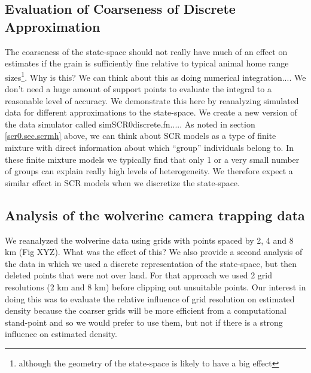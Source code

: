 \subsection{Evaluation of Coarseness of Discrete Approximation}
The coarseness of the state-space should not really have much of an effect on estimates if the grain is sufficiently fine relative to typical animal home range sizes\footnote{ although the geometry of the state-space is likely to have a big effect}. Why is this? We can think about this as doing numerical integration.... We don't need a huge amount of support points to evaluate the integral to a reasonable level of accuracy. We demonstrate this here by reanalyzing simulated data for different approximations to the state-space. We create a new version of the data simulator called simSCR0discrete.fn.....
As noted in section \ref{scr0.sec.scrmh} above, we can think about SCR
models as a type of finite mixture \citep{norris_pollock:1996,
  pledger:2000} with direct information about which ``group'' individuals belong to. In these finite mixture models we typically find that only 1 or a very small number of groups can explain really high levels of heterogeneity. We therefore expect a similar effect in SCR models when we discretize the state-space. 


\subsection{Analysis of the wolverine camera trapping data}

We reanalyzed the wolverine data using grids with points spaced by 2, 4 and 8 km (Fig XYZ). What was the effect of this?
We also provide a second analysis of the data in which we used a discrete representation of the state-space, but then deleted points that were not over land. For that approach we used 2 grid resolutions (2 km and 8 km) before clipping out unsuitable points. Our interest in doing this was to evaluate the relative influence of grid resolution on estimated density because the coarser grids will be more efficient from a computational stand-point and so we would prefer to use them, but not if there is a strong influence on estimated density.  


